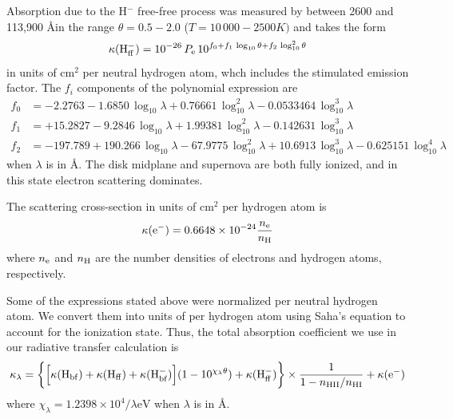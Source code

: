 Absorption due to the H$^{-}$ free-free process was measured by \citet{BellBerrington87} between 2600 and 113,900 \AA in the range $\theta = 0.5 - 2.0$ ($T = 10\,000 - 2500 K)$ and takes the form
\begin{equation}
    \kappa({\rm H_{ff}^-}) = 10^{-26} \, P_{\rm e} \, 10^{f_0 + f_1 \, \log_{10} \theta + f_2 \, \log_{10}^2 \theta}
\end{equation}
in units of cm$^2$ per neutral hydrogen atom, whch includes the stimulated emission factor. The $f_i$ components of the polynomial expression are
\begin{align}
    f_0 &= -2.2763 - 1.6850 \, \log_{10} \lambda + 0.76661 \, \log_{10}^2 \lambda - 0.0533464 \, \log_{10}^3 \lambda \\
    f_1 &= +15.2827 - 9.2846 \, \log_{10} \lambda + 1.99381 \, \log_{10}^2 \lambda - 0.142631 \, \log_{10}^3 \lambda \\
    f_2 &= -197.789 + 190.266 \, \log_{10} \lambda - 67.9775 \, \log_{10}^2 \lambda + 10.6913 \, \log_{10}^3 \lambda - 0.625151 \, \log_{10}^4 \lambda
\end{align}
when $\lambda$ is in \AA. The disk midplane and supernova are both fully ionized, and in this state electron scattering dominates.

The scattering cross-section in units of cm$^{2}$ per hydrogen atom is 
\begin{equation}
\kappa(\text{e}^-) = 0.6648 \times 10^{-24} \frac{n_{\rm e}}{n_{\rm H}}  \\
\end{equation}
where $n_{\rm e}$ and $n_{\rm H}$ are the number densities of electrons and hydrogen atoms, respectively.

Some of the expressions stated above were normalized per neutral hydrogen atom. We convert them into units of per hydrogen atom using Saha's equation to account for the ionization state. Thus, the total absorption coefficient we use in our radiative transfer calculation is 
\begin{equation}
	\label{eqn:total-kappa}
	\kappa_{\lambda} = \biggl\{ \Bigl[ \kappa({\rm H_{bf}}) + \kappa({\rm H_{ff}}) + \kappa({\rm H^-_{bf}}) \Bigr] (1-10^{\chi_\lambda \theta}) + \kappa({\rm H_{ff}^-}) \biggr\} \times \frac{1}{1-n_{\rm HII}/n_{\rm HI}} + \kappa({\rm e^-})
\end{equation}
where $\chi_\lambda = 1.2398 \times 10^4/\lambda\text{eV}$ when $\lambda$ is in \AA.


